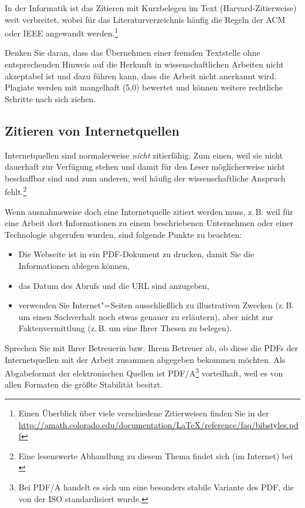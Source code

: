 \documentclass[a4paper,11pt,headings=normal]{scrartcl}
\begin{document}
In der Informatik ist das Zitieren mit Kurzbelegen im Text (Harvard-Zitierweise) weit verbreitet, wobei für das Literaturverzeichnis häufig die Regeln der \acs{ACM} oder \acs{IEEE} angewandt werden.\footnote{Einen Überblick über viele verschiedene Zitierweisen finden Sie in der \url{http://amath.colorado.edu/documentation/LaTeX/reference/faq/bibstyles.pdf}}

Denken Sie daran, dass das Übernehmen einer fremden Textstelle ohne entsprechenden Hinweis auf die Herkunft in wissenschaftlichen Arbeiten nicht akzeptabel ist und dazu führen kann, dass die Arbeit nicht anerkannt wird. Plagiate werden mit mangelhaft (5,0) bewertet und können weitere rechtliche Schritte nach sich ziehen.

\subsection{Zitieren von Internetquellen}
Internetquellen sind normalerweise \textit{nicht} zitierfähig. Zum einen, weil sie nicht dauerhaft zur Verfügung stehen und damit für den Leser möglicherweise nicht beschaffbar sind und zum anderen, weil häufig der wissenschaftliche Anspruch fehlt.\footnote{Eine lesenswerte Abhandlung zu diesem Thema findet sich (im Internet) bei \autocite{Weber2006}}

Wenn ausnahmsweise doch eine Internetquelle zitiert werden muss, z.\,B. weil für eine Arbeit dort Informationen zu einem beschriebenen Unternehmen oder einer Technologie abgerufen wurden, sind folgende Punkte zu beachten:

\begin{itemize}
\item Die Webseite ist in ein PDF-Dokument zu drucken, damit Sie die Informationen ablegen können,
\item das Datum des Abrufs und die URL sind anzugeben,
\item verwenden Sie Internet"=Seiten ausschließlich zu illustrativen Zwecken (z.\,B. um einen Sachverhalt noch etwas genauer zu erläutern), aber nicht zur Faktenvermittlung (z.\,B. um eine Ihrer Thesen zu belegen).
\end{itemize}

Sprechen Sie mit Ihrer Betreuerin bzw. Ihrem Betreuer ab, ob diese die PDFs der Internetquellen mit der Arbeit zusammen abgegeben bekommen möchten. Als Abgabeformat der elektronischen Quellen ist PDF/A\footnote{Bei PDF/A handelt es sich um eine besonders stabile Variante des \ac{PDF}, die von der  \ac{ISO} standardisiert wurde.} vorteilhaft, weil es von allen Formaten die größte Stabilität besitzt.
\end{document}
